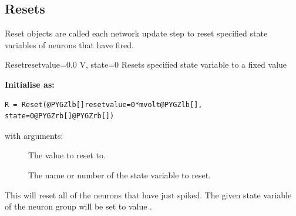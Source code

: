 \documentclass[letterpaper,10pt,english]{manual}
\begin{document}
\subsection{Resets}

Reset objects are called each network update step to reset
specified state variables of neurons that have fired.

\hypertarget{brian.Reset}{}\begin{classdesc}{Reset}{resetvalue=0.0 V, state=0}
Resets specified state variable to a fixed value

\textbf{Initialise as:}

\begin{Verbatim}[commandchars=@\[\]]
R = Reset(@PYGZlb[]resetvalue=0*mvolt@PYGZlb[], state=0@PYGZrb[]@PYGZrb[])
\end{Verbatim}

with arguments:
\begin{description}
\item[]
The value to reset to.

\item[]
The name or number of the state variable to reset.

\end{description}

This will reset all of the neurons that have just spiked. The
given state variable of the neuron group will be set to value
.
\end{classdesc}
\end{document}
